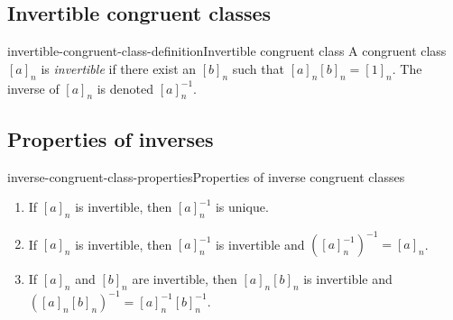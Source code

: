\documentclass[preview]{standalone}
\begin{document}


\subsection{Invertible congruent classes}

\begin{snippetdefinition}{invertible-congruent-class-definition}{Invertible congruent class}
    A congruent class \({[a]}_n\) is \textit{invertible}
    if there exist an \({[b]}_n\) such that \({[a]}_n{[b]}_n={[1]}_n\).
    The inverse of \({[a]}_n\) is denoted \({[a]}_n^{-1}\).
\end{snippetdefinition}

\subsection{Properties of inverses}

\begin{snippetproposition}{inverse-congruent-class-properties}{Properties of inverse congruent classes}
    \begin{enumerate}
        \item If \({[a]}_n\) is invertible, then \({[a]}_n^{-1}\) is unique.
        \item If \({[a]}_n\) is invertible, then \({[a]}_n^{-1}\) is invertible and \(({[a]}_n^{-1})^{-1}={[a]}_n\).
        \item If \({[a]}_n\) and \({[b]}_n\) are invertible, then \({[a]}_n{[b]}_n\) is invertible and
        \({({[a]}_n{[b]}_n)}^{-1} = {[a]}_n^{-1}{[b]}_n^{-1}\).
    \end{enumerate}
\end{snippetproposition}



\end{document}
